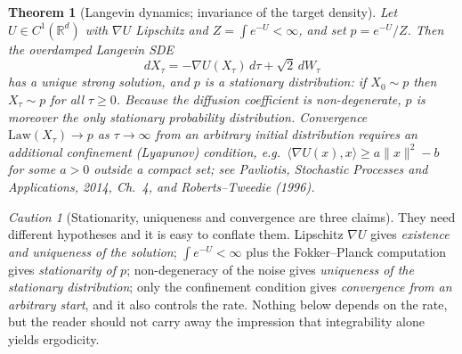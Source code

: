 \documentclass[11pt,a4paper]{report}
\newtheorem{theorem}{Theorem}[chapter]
\theoremstyle{definition}
\theoremstyle{remark}
\newtheorem{caution}[caution]{Caution}
\newcommand{\RR}{\mathbb R}
\begin{document}
\begin{theorem}[Langevin dynamics; invariance of the target density]
\label{thm:langevin}
Let $U\in C^1(\RR^d)$ with $\nabla U$ Lipschitz and $Z=\int e^{-U}<\infty$, and
set $p = e^{-U}/Z$. Then the \emph{overdamped Langevin SDE}
\[
dX_\tau = -\nabla U(X_\tau)\,d\tau + \sqrt2\,dW_\tau
\]
has a unique strong solution, and $p$ is a \emph{stationary} distribution:
if $X_0\sim p$ then $X_\tau\sim p$ for all $\tau\ge0$. Because the diffusion
coefficient is non-degenerate, $p$ is moreover the \emph{only} stationary
probability distribution. Convergence
$\mathrm{Law}(X_\tau)\to p$ as $\tau\to\infty$ from an arbitrary initial
distribution requires an \emph{additional} confinement (Lyapunov) condition,
e.g.\ $\langle\nabla U(x),x\rangle\ge a\|x\|^2-b$ for some $a>0$ outside a
compact set; see Pavliotis, \emph{Stochastic Processes and Applications},
2014, Ch.~4, and Roberts--Tweedie (1996).
\end{theorem}

\begin{caution}[Stationarity, uniqueness and convergence are three claims]
\label{caution:langevin-three-claims}
They need different hypotheses and it is easy to conflate them. Lipschitz
$\nabla U$ gives \emph{existence and uniqueness of the solution};
$\int e^{-U}<\infty$ plus the Fokker--Planck computation gives
\emph{stationarity of $p$}; non-degeneracy of the noise gives
\emph{uniqueness of the stationary distribution}; only the confinement
condition gives \emph{convergence from an arbitrary start}, and it also
controls the rate. Nothing below depends on the rate, but the reader should
not carry away the impression that integrability alone yields ergodicity.
\end{caution}
\end{document}
